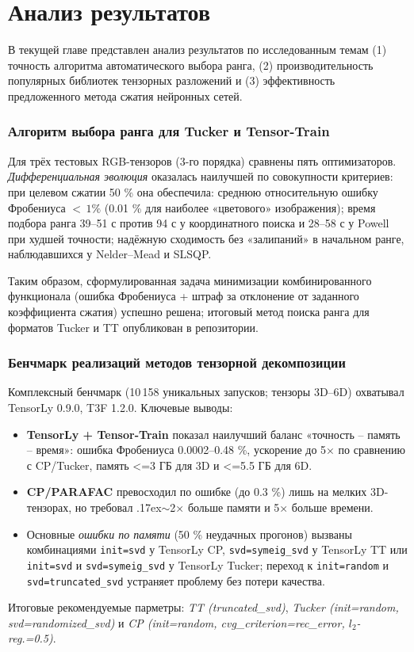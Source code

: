 \chapter{Анализ результатов}
\label{chap:eval}

В текущей главе представлен анализ результатов по исследованным темам (1) точность алгоритма автоматического выбора ранга, (2) производительность популярных библиотек тензорных разложений и (3) эффективность предложенного метода сжатия нейронных сетей.

\subsection*{Алгоритм выбора ранга для Tucker и Tensor-Train}
Для трёх тестовых RGB-тензоров (3-го порядка) сравнены пять оптимизаторов. \emph{Дифференциальная эволюция} оказалась наилучшей по совокупности критериев: при целевом сжатии 50 \% она обеспечила: среднюю относительную ошибку Фробениуса ${<}\,1\%$ (0.01 \% для наиболее «цветового» изображения); время подбора ранга 39–51 с против 94 с у координатного поиска и 28–58 с у Powell при худшей точности; надёжную сходимость без «залипаний» в начальном ранге, наблюдавшихся у Nelder–Mead и SLSQP.

Таким образом, сформулированная задача минимизации комбинированного функционала (ошибка Фробениуса + штраф за отклонение от заданного коэффициента сжатия) успешно решена; итоговый метод поиска ранга для форматов Tucker и TT опубликован в репозитории.

\subsection*{Бенчмарк реализаций методов тензорной декомпозиции}
Комплексный бенчмарк (10\,158 уникальных запусков; тензоры 3D–6D) охватывал TensorLy 0.9.0, T3F 1.2.0. Ключевые выводы:
\begin{itemize}\setlength\itemsep{0.2em}
    \item \textbf{TensorLy + Tensor-Train} показал наилучший баланс «точность – память – время»: ошибка Фробениуса 0.0002–0.48 \%, ускорение до 5× по сравнению с CP/Tucker, память <=3 ГБ для 3D и <=5.5 ГБ для 6D.
    \item \textbf{CP/PARAFAC} превосходил по ошибке (до 0.3 \%) лишь на мелких 3D-тензорах, но требовал {\raise.17ex\hbox{$\scriptstyle\sim$}}2× больше памяти и 5× больше времени.
    \item Основные \emph{ошибки по памяти} (50 \% неудачных прогонов) вызваны комбинациями \texttt{init=svd} у TensorLy CP, \texttt{svd=symeig\_svd} у TensorLy TT или \texttt{init=svd} и \texttt{svd=symeig\_svd} у TensorLy Tucker; переход к \texttt{init=random} и \texttt{svd=truncated\_svd} устраняет проблему без потери качества.
\end{itemize}
Итоговые рекомендуемые парметры:  
\emph{TT (truncated\_svd)}, \emph{Tucker (init=random, svd=randomized\_svd)} и \emph{CP (init=random, cvg\_criterion=rec\_error, $l_2$-reg.=0.5)}.

